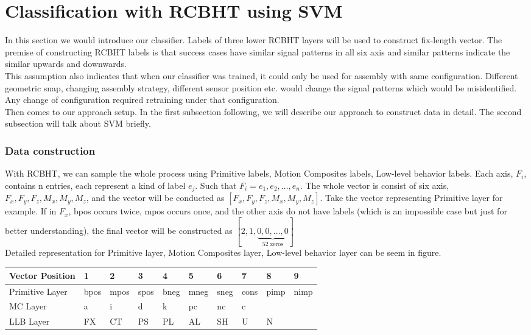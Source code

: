 %

\chapter{Classification with RCBHT using SVM}
In this section we would introduce our classifier. Labels of three lower RCBHT layers will be used to construct fix-length vector. The premise of constructing RCBHT labels is that success cases have similar signal patterns in all six axis and similar patterns indicate the similar upwards and downwards. \\
This assumption also indicates that when our classifier was trained, it could only be used for assembly with same configuration. Different geometric snap, changing assembly strategy, different sensor position etc. would change the signal patterns which would be misidentified. Any change of configuration required retraining under that configuration. \\
Then comes to our approach setup. In the first subsection following, we will describe our approach to construct data in detail. The second subsection will talk about SVM briefly. 
\subsection{Data construction}
\indent With RCBHT, we can sample the whole process using Primitive labels, Motion Composites labels, Low-level behavior labels. Each axis, $F_{i}$, contains n entries, each represent a kind of label $e_{j}$. Such that $F_{i} = {e_{1}, e_{2}, \dots , e_{n}}$. The whole vector is consist of six axis, $F_{x}, F_{y}, F_{z}, M_{x}, M_{y}, M_{z}$, and the vector will be conducted as $[F_{x}, F_{y}, F_{z}, M_{x}, M_{y}, M_{z}]$. Take the vector representing Primitive layer for example. If in $F_{x}$, bpos occurs twice, mpos occurs once, and the other axis do not have labels (which is an impossible case but just for better understanding), the final vector will be constructed as $[2, 1,\underbrace{0,0, \dots, 0}_\text{52 zeros}]$     \\
\indent Detailed representation for Primitive layer, Motion Composites layer, Low-level behavior layer can be seem in figure.
\begin {table}[h]
\centering
\begin {tabular}{|llllllllll|}
\hline
Vector Position & 1     & 2     & 3     & 4     & 5     & 6     & 7     & 8     & 9     \\ \hline
Primitive Layer & bpos  & mpos  & spos  & bneg  & mneg  & sneg  & cons  & pimp  & nimp  \\ \hline 
MC Layer        & a     & i     & d     & k     & pc    & nc    & c     &       &       \\ \hline
LLB Layer       & FX    & CT    & PS    & PL    & AL    & SH    & U     & N     &       \\ \hline
\end {tabular}
\end {table}

